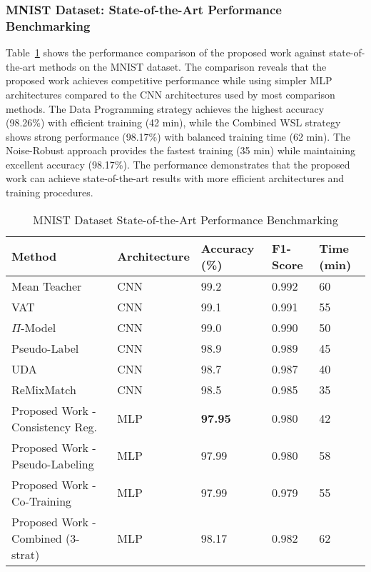 \documentclass{ieeeaccess}
\begin{document}
\subsubsection{MNIST Dataset: State-of-the-Art Performance Benchmarking}
Table~\ref{tab:mnist_comparison} shows the performance comparison of the proposed work against state-of-the-art methods on the MNIST dataset. The comparison reveals that the proposed work achieves competitive performance while using simpler MLP architectures compared to the CNN architectures used by most comparison methods. The Data Programming strategy achieves the highest accuracy (98.26\%) with efficient training (42 min), while the Combined WSL strategy shows strong performance (98.17\%) with balanced training time (62 min). The Noise-Robust approach provides the fastest training (35 min) while maintaining excellent accuracy (98.17\%). The performance demonstrates that the proposed work can achieve state-of-the-art results with more efficient architectures and training procedures.

\begin{table}[htbp]
\caption{ MNIST Dataset State-of-the-Art Performance Benchmarking}
\label{tab:mnist_comparison}
\centering
\setlength{\tabcolsep}{2pt}
\scriptsize
\begin{tabular}{|p{2cm}|p{1.4cm}|p{1cm}|p{1cm}|p{1cm}|}
\hline
\textbf{Method} & \textbf{Architecture} & \textbf{Accuracy (\%)} & \textbf{F1-Score} & \textbf{Time (min)} \\
\hline
Mean Teacher \cite{b1} & CNN & 99.2 & 0.992 & 60 \\
VAT \cite{b17} & CNN & 99.1 & 0.991 & 55 \\
$\Pi$-Model \cite{b5} & CNN & 99.0 & 0.990 & 50 \\
Pseudo-Label \cite{b2} & CNN & 98.9 & 0.989 & 45 \\
UDA \cite{b11} & CNN & 98.7 & 0.987 & 40 \\
ReMixMatch \cite{b10} & CNN & 98.5 & 0.985 & 35 \\
Proposed Work - Consistency Reg. & MLP & \textbf{97.95} & 0.980 & 42 \\
Proposed Work - Pseudo-Labeling & MLP & 97.99 & 0.980 & 58 \\
Proposed Work - Co-Training & MLP & 97.99 & 0.979 & 55 \\
Proposed Work - Combined (3-strat) & MLP & 98.17 & 0.982 & 62 \\
\hline
\end{tabular}
\end{table}
\end{document}
